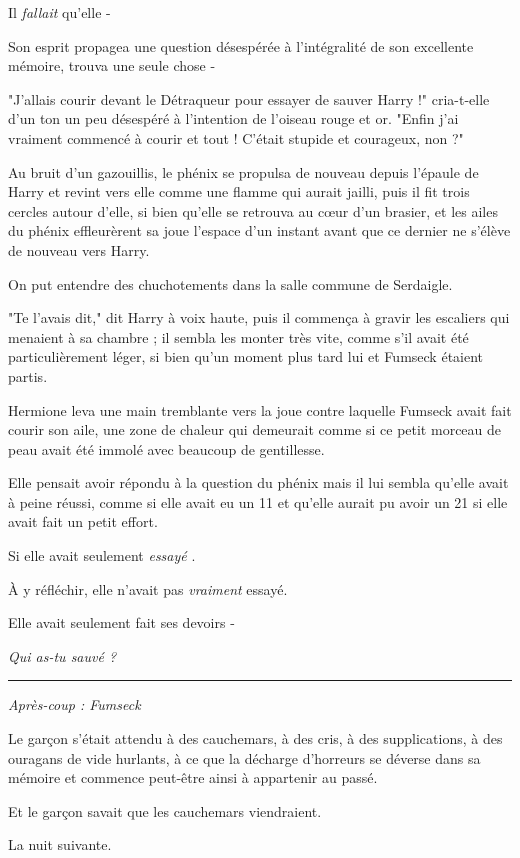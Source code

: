 Il \emph{fallait}  qu'elle -

Son esprit propagea une question désespérée à l'intégralité de son excellente mémoire, trouva une seule chose -

"J'allais courir devant le Détraqueur pour essayer de sauver Harry !" cria-t-elle d'un ton un peu désespéré à l'intention de l'oiseau rouge et or. "Enfin j'ai vraiment commencé à courir et tout ! C'était stupide et courageux, non ?"

Au bruit d'un gazouillis, le phénix se propulsa de nouveau depuis l'épaule de Harry et revint vers elle comme une flamme qui aurait jailli, puis il fit trois cercles autour d'elle, si bien qu'elle se retrouva au cœur d'un brasier, et les ailes du phénix effleurèrent sa joue l'espace d'un instant avant que ce dernier ne s'élève de nouveau vers Harry.

On put entendre des chuchotements dans la salle commune de Serdaigle.

"Te l'avais dit," dit Harry à voix haute, puis il commença à gravir les escaliers qui menaient à sa chambre ; il sembla les monter très vite, comme s'il avait été particulièrement léger, si bien qu'un moment plus tard lui et Fumseck étaient partis.

Hermione leva une main tremblante vers la joue contre laquelle Fumseck avait fait courir son aile, une zone de chaleur qui demeurait comme si ce petit morceau de peau avait été immolé avec beaucoup de gentillesse.

Elle pensait avoir répondu à la question du phénix mais il lui sembla qu'elle avait à peine réussi, comme si elle avait eu un 11 et qu'elle aurait pu avoir un 21 si elle avait fait un petit effort.

Si elle avait seulement \emph{essayé} .

À y réfléchir, elle n'avait pas \emph{vraiment}  essayé.

Elle avait seulement fait ses devoirs -

\emph{Qui as-tu sauvé ?} 
\par\noindent\rule{\textwidth}{0.4pt}
\emph{Après-coup : Fumseck} 

Le garçon s'était attendu à des cauchemars, à des cris, à des supplications, à des ouragans de vide hurlants, à ce que la décharge d'horreurs se déverse dans sa mémoire et commence peut-être ainsi à appartenir au passé.

Et le garçon savait que les cauchemars viendraient.

La nuit suivante.

